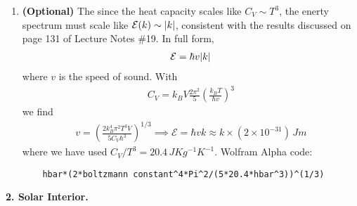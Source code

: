 \documentclass{article}
\theoremstyle{definition}
\newcommand{\f}[2]{\frac{#1}{#2}}
\newcommand{\lp}{\left(}
\newcommand{\rp}{\right)}
\begin{document}
\begin{enumerate}[label=(\alph*)]
	\item \textbf{(Optional)} The since the heat capacity scales like $C_V \sim T^3$, the enerty spectrum must scale like $\mathcal{E}(k) \sim \abs{k}$, consistent with the results discussed on page 131 of Lecture Notes \#19. In full form, 
	\begin{align*}
	\mathcal{E} = \hbar v \abs{k} 
	\end{align*}
	where $v$ is the speed of sound. With 
	\begin{align*}
	C_V = k_B V \f{2\pi^2}{5} \lp \f{k_B T}{\hbar v} \rp^3 
	\end{align*}
	we find 
	\begin{align*}
	v = \lp \f{2 k_B^4 \pi^2 T^3 V}{5 C_V \hbar^3}\rp^{1/3} \implies \mathcal{E} = \hbar v k \approx \boxed{k \times (2\times 10^{-31})\, J m}
	\end{align*}
	where we have used $C_V/T^3 = 20.4 \, JKg^{-1}K^{-1}$. Wolfram Alpha code:
	\begin{lstlisting}
	hbar*(2*boltzmann constant^4*Pi^2/(5*20.4*hbar^3))^(1/3)
	\end{lstlisting}
	
\end{enumerate}


\noindent \textbf{2. Solar Interior.}
\end{document}
